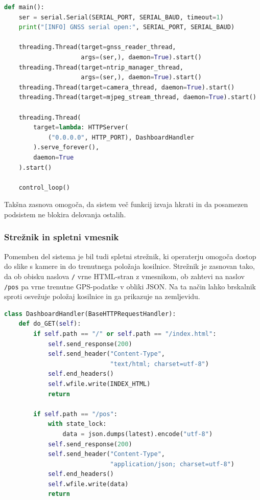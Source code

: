 \documentclass[12pt]{article}
\begin{document}
\begin{lstlisting}[language=Python,
  caption={Glavna funkcija programa in zagon vseh niti.}]
def main():
    ser = serial.Serial(SERIAL_PORT, SERIAL_BAUD, timeout=1)
    print("[INFO] GNSS serial open:", SERIAL_PORT, SERIAL_BAUD)

    threading.Thread(target=gnss_reader_thread,
                     args=(ser,), daemon=True).start()
    threading.Thread(target=ntrip_manager_thread,
                     args=(ser,), daemon=True).start()
    threading.Thread(target=camera_thread, daemon=True).start()
    threading.Thread(target=mjpeg_stream_thread, daemon=True).start()

    threading.Thread(
        target=lambda: HTTPServer(
            ("0.0.0.0", HTTP_PORT), DashboardHandler
        ).serve_forever(),
        daemon=True
    ).start()

    control_loop()
\end{lstlisting}

Takšna zasnova omogoča, da sistem več funkcij izvaja hkrati in da
posamezen podsistem ne blokira delovanja ostalih.

\subsubsection{Strežnik in spletni vmesnik}

Pomemben del sistema je bil tudi spletni strežnik, ki operaterju
omogoča dostop do slike s kamere in do trenutnega položaja kosilnice.
Strežnik je zasnovan tako, da ob obisku naslova \texttt{/} vrne
HTML-stran z vmesnikom, ob zahtevi na naslov \texttt{/pos} pa vrne
trenutne GPS-podatke v obliki JSON. Na ta način lahko brskalnik sproti
osvežuje položaj kosilnice in ga prikazuje na zemljevidu.

\begin{lstlisting}[language=Python,
  caption={Osnovni del strežnika za pošiljanje HTML-strani in
    GPS-podatkov.}]
class DashboardHandler(BaseHTTPRequestHandler):
    def do_GET(self):
        if self.path == "/" or self.path == "/index.html":
            self.send_response(200)
            self.send_header("Content-Type",
                             "text/html; charset=utf-8")
            self.end_headers()
            self.wfile.write(INDEX_HTML)
            return

        if self.path == "/pos":
            with state_lock:
                data = json.dumps(latest).encode("utf-8")
            self.send_response(200)
            self.send_header("Content-Type",
                             "application/json; charset=utf-8")
            self.end_headers()
            self.wfile.write(data)
            return
\end{lstlisting}
\end{document}
